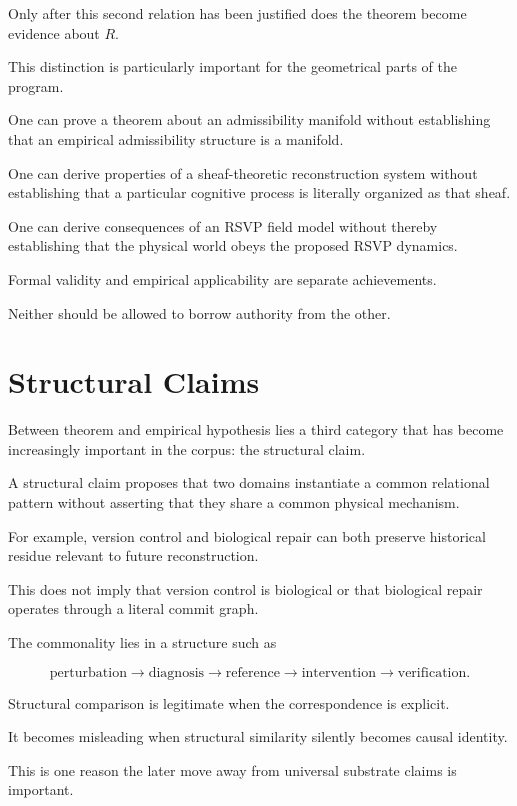 \documentclass[11pt]{article}
\theoremstyle{remark}
\newcommand{\RSVP}{\textsc{RSVP}}
\begin{document}
Only after this second relation has been justified does the theorem become
evidence about $R$.

This distinction is particularly important for the geometrical parts of the
program.

One can prove a theorem about an admissibility manifold without establishing
that an empirical admissibility structure is a manifold.

One can derive properties of a sheaf-theoretic reconstruction system without
establishing that a particular cognitive process is literally organized as that
sheaf.

One can derive consequences of an \RSVP{} field model without thereby
establishing that the physical world obeys the proposed \RSVP{} dynamics.

Formal validity and empirical applicability are separate achievements.

Neither should be allowed to borrow authority from the other.

\section{Structural Claims}

Between theorem and empirical hypothesis lies a third category that has become
increasingly important in the corpus: the structural claim.

A structural claim proposes that two domains instantiate a common relational
pattern without asserting that they share a common physical mechanism.

For example, version control and biological repair can both preserve historical
residue relevant to future reconstruction.

This does not imply that version control is biological or that biological repair
operates through a literal commit graph.

The commonality lies in a structure such as

\begin{equation}
\text{perturbation}
\rightarrow
\text{diagnosis}
\rightarrow
\text{reference}
\rightarrow
\text{intervention}
\rightarrow
\text{verification}.
\end{equation}

Structural comparison is legitimate when the correspondence is explicit.

It becomes misleading when structural similarity silently becomes causal
identity.

This is one reason the later move away from universal substrate claims is
important.
\end{document}
